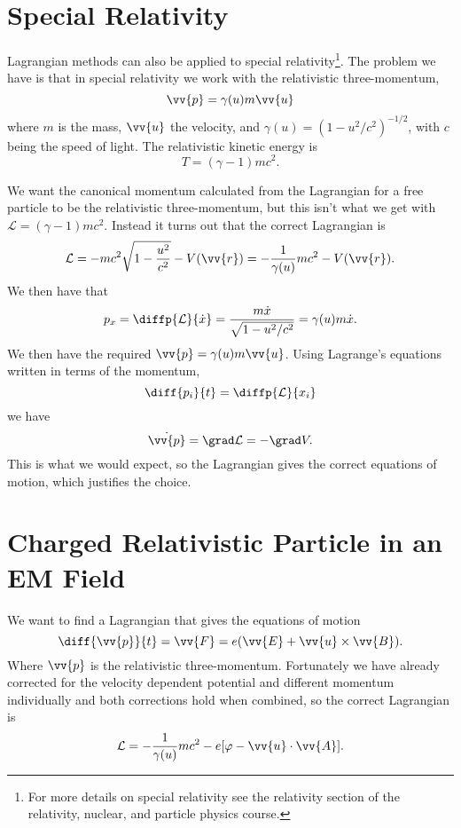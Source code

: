 \documentclass[fleqn]{NotesClass}
\newcommand*{\lagrangian}{\mathcal{L}}
\begin{document}
    \section{Special Relativity}
    Lagrangian methods can also be applied to special relativity\footnote{For more details on special relativity see the relativity section of the relativity, nuclear, and particle physics course.}.
    The problem we have is that in special relativity we work with the relativistic three-momentum,
    \begin{equation}
        \vv{p} = \gamma(u)m\vv{u}
    \end{equation}
    where \(m\) is the mass, \(\vv{u}\) the velocity, and \(\gamma(u) = (1 - u^2/c^2)^{-1/2}\), with \(c\) being the speed of light.
    The relativistic kinetic energy is
    \begin{equation}
        T = (\gamma - 1)mc^2.
    \end{equation}
    
    We want the canonical momentum calculated from the Lagrangian for a free particle to be the relativistic three-momentum, but this isn't what we get with \(\lagrangian = (\gamma - 1)mc^2\).
    Instead it turns out that the correct Lagrangian is
    \begin{equation}
        \lagrangian = -mc^2\sqrt{1 - \frac{u^2}{c^2}} - V(\vv{r}) = -\frac{1}{\gamma(u)}mc^2 - V(\vv{r}).
    \end{equation}
    We then have that
    \begin{equation}
        p_x = \diffp{\lagrangian}{\dot{x}} = \frac{m\dot{x}}{\sqrt{1 - u^2/c^2}} = \gamma(u)m\dot{x}.
    \end{equation}
    We then have the required \(\vv{p} = \gamma(u)m\vv{u}\).
    Using Lagrange's equations written in terms of the momentum,
    \begin{equation}
        \diff{p_i}{t} = \diffp{\lagrangian}{x_i}
    \end{equation}
    we have
    \begin{equation}
        \dot{\vv{p}} = \grad \lagrangian = -\grad V.
    \end{equation}
    This is what we would expect, so the Lagrangian gives the correct equations of motion, which justifies the choice.
    
    \section{Charged Relativistic Particle in an EM Field}
    We want to find a Lagrangian that gives the equations of motion
    \begin{equation}
        \diff{\vv{p}}{t} = \vv{F} = e(\vv{E} + \vv{u} \times \vv{B}).
    \end{equation}
    Where \(\vv{p}\) is the relativistic three-momentum.
    Fortunately we have already corrected for the velocity dependent potential and different momentum individually and both corrections hold when combined, so the correct Lagrangian is
    \begin{equation}
        \lagrangian = -\frac{1}{\gamma(u)}mc^2 - e[\varphi - \vv{u}\cdot\vv{A}].
    \end{equation}
    
\end{document}
